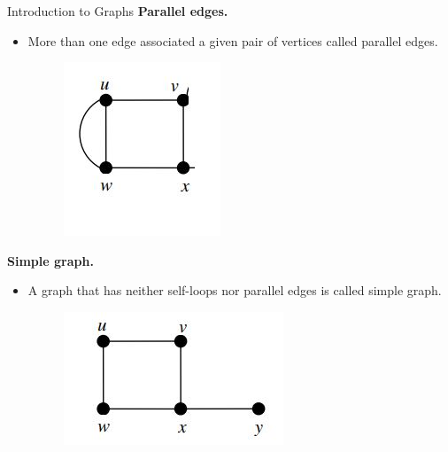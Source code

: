 \documentclass{beamer}
\begin{document}
\begin{frame}{Introduction to Graphs}
	\textbf{Parallel edges.}
	\begin{itemize}
		\item More than one edge associated a given pair of vertices called parallel edges.
		\begin{figure}
			\includegraphics[scale=.5]{img/m4}
		\end{figure}
	\end{itemize}
	\textbf{Simple graph.}
\begin{itemize}
	\item A graph that has neither self-loops nor parallel edges is called simple graph.
	\begin{figure}
		\includegraphics[scale=.5]{img/m5}
	\end{figure}
\end{itemize}
\end{frame}
\end{document}
